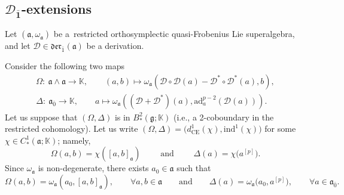\documentclass[10pt,a4paper]{amsart}
\numberwithin{equation}{section}
\begin{document}
 \subsection[D\_1-extensions]{$\boldsymbol{{\mathscr D}_{\bar 1}}$-extensions}

Let $(\mathfrak{a}, \omega_\mathfrak{a})$ be a~restricted orthosymplectic quasi-Frobenius Lie superalgebra, and let ${\mathscr D}\in \mathfrak{der}_{\bar 1}(\mathfrak{a})$ be a derivation.

Consider the following two maps
\begin{gather*}%
\Omega\colon\ \mathfrak{a}\wedge \mathfrak{a} \rightarrow \mathbb{K}, \qquad (a,b) \mapsto \omega_\mathfrak{a}( {\mathscr D} \circ {\mathscr D}(a) - {\mathscr D}^* \circ {\mathscr D}^*(a) , b), \\
\Delta\colon\ \mathfrak{a}_{\bar 0} \rightarrow \mathbb{K}, \qquad a \mapsto \omega_\mathfrak{a}(({\mathscr D}+{\mathscr D}^*)(a),\mathrm{ad}_a^{p-2}({\mathscr D}(a))).
\end{gather*}
Let us suppose that $(\Omega, \Delta)$ is in $B^2_*(\mathfrak{g};\mathbb{K})$ (i.e., a 2-coboundary in the restricted cohomology). Let us write $(\Omega, \Delta)= \bigl(d^1_{\mathrm{CE}} (\chi), \mathrm{ind}^1(\chi) \bigr)$ for some $\chi\in C^1_*(\mathfrak{a}; \mathbb{K})$; namely,
 \[
\Omega(a,b)=\chi([a,b]_\mathfrak{a}) \qquad \text{ and } \qquad \Delta(a)=\chi\bigl(a^{[p]}\bigr).
\]
Since $\omega_\mathfrak{a}$ is non-degenerate, there exists $a_0\in \mathfrak{a}$ such that
\begin{equation}
\label{EOazero}
\Omega(a,b)=\omega_\mathfrak{a}(a_0,[a,b]_\mathfrak{a}), \qquad \forall a,b \in \mathfrak{a} \qquad \text{and} \qquad \Delta(a)=\omega_\mathfrak{a}\bigl(a_0,a^{[p]}\bigr),\qquad \forall a\in \mathfrak{a}_{\bar 0}.
\end{equation}
\end{document}
